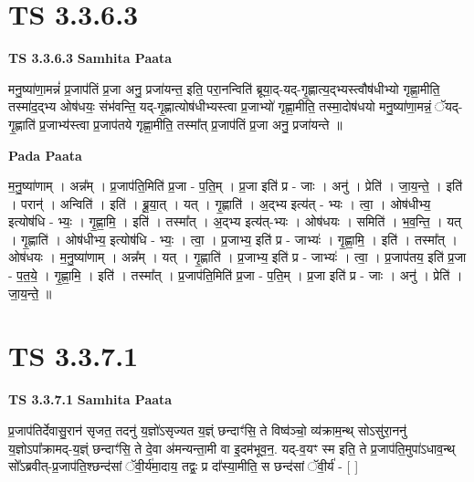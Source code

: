\documentclass[17pt]{extarticle}
\begin{document}

\section{ TS 3.3.6.3 }

\textbf{TS 3.3.6.3 } \newline
\textbf{Samhita Paata} \newline

मनु॒ष्या॑णा॒मन्नं॑ प्र॒जाप॑तिं प्र॒जा अनु॒ प्रजा॑यन्त॒ इति॒ परा॒नन्विति॑ ब्रूया॒द्-यद्-गृ॒ह्णात्य॒द्भ्यस्त्वौष॑धीभ्यो गृह्णा॒मीति॒ तस्मा॑द॒द्भ्य ओष॑धयः॒ संभ॑वन्ति॒ यद्-गृ॒ह्णात्योष॑धीभ्यस्त्वा प्र॒जाभ्यो॑ गृह्णा॒मीति॒ तस्मा॒दोष॑धयो मनु॒ष्या॑णा॒मन्नं॒ ॅयद्-गृ॒ह्णाति॑ प्र॒जाभ्य॑स्त्वा प्र॒जाप॑तये गृह्णा॒मीति॒ तस्मा᳚त् प्र॒जाप॑तिं प्र॒जा अनु॒ प्रजा॑यन्ते ॥ \newline

\textbf{Pada Paata} \newline

म॒नु॒ष्या॑णाम् । अन्न᳚म् । प्र॒जाप॑ति॒मिति॑ प्र॒जा - प॒ति॒म् । प्र॒जा इति॑ प्र - जाः । अनु॑ । प्रेति॑ । जा॒य॒न्ते॒ । इति॑ । परान्॑ । अन्विति॑ । इति॑ । ब्रू॒या॒त् । यत् । गृ॒ह्णाति॑ । अ॒द्भ्य इत्य॑त् - भ्यः । त्वा॒ । ओष॑धीभ्य॒ इत्योष॑धि - भ्यः॒ । गृ॒ह्णा॒मि॒ । इति॑ । तस्मा᳚त् । अ॒द्भ्य इत्य॑त्-भ्यः । ओष॑धयः । समिति॑ । भ॒व॒न्ति॒ । यत् । गृ॒ह्णाति॑ । ओष॑धीभ्य॒ इत्योष॑धि - भ्यः॒ । त्वा॒ । प्र॒जाभ्य॒ इति॑ प्र - जाभ्यः॑ । गृ॒ह्णा॒मि॒ । इति॑ । तस्मा᳚त् । ओष॑धयः । म॒नु॒ष्या॑णाम् । अन्न᳚म् । यत् । गृ॒ह्णाति॑ । प्र॒जाभ्य॒ इति॑ प्र - जाभ्यः॑ । त्वा॒ । प्र॒जाप॑तय॒ इति॑ प्र॒जा - प॒त॒ये॒ । गृ॒ह्णा॒मि॒ । इति॑ । तस्मा᳚त् । प्र॒जाप॑ति॒मिति॑ प्र॒जा - प॒ति॒म् । प्र॒जा इति॑ प्र - जाः । अनु॑ । प्रेति॑ । जा॒य॒न्ते॒ ॥  \newline





\section{ TS 3.3.7.1 }

\textbf{TS 3.3.7.1 } \newline
\textbf{Samhita Paata} \newline

प्र॒जाप॑तिर्देवासु॒रान॑ सृजत॒ तदनु॑ य॒ज्ञो॑ऽसृज्यत य॒ज्ञ्ं छन्दाꣳ॑सि॒ ते विष्व॑ञ्चो॒ व्य॑क्राम॒न्थ् सोऽसु॑रा॒ननु॑ य॒ज्ञोऽपा᳚क्रामद्-य॒ज्ञ्ं छन्दाꣳ॑सि॒ ते दे॒वा अ॑मन्यन्ता॒मी वा इ॒दम॑भूव॒न॒. यद्-व॒यꣳ स्म इति॒ ते प्र॒जाप॑ति॒मुपा॑ऽधाव॒न्थ् सो᳚ऽब्रवीत्-प्र॒जाप॑ति॒श्छन्द॑सां ॅवी॒र्य॑मा॒दाय॒ तद्वः॒ प्र दा᳚स्या॒मीति॒ स छन्द॑सां ॅवी॒र्य॑ - [  ] \newline
\end{document}
